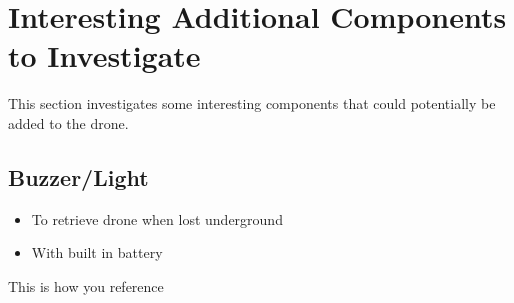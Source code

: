 \chapter{Interesting Additional Components to Investigate}

This section investigates some interesting components that could potentially be added to the drone.

\section{Buzzer/Light}
	\begin{itemize}
		\item To retrieve drone when lost underground
		\item With built in battery
	\end{itemize}

This is how you reference \cite{GraphBased}
